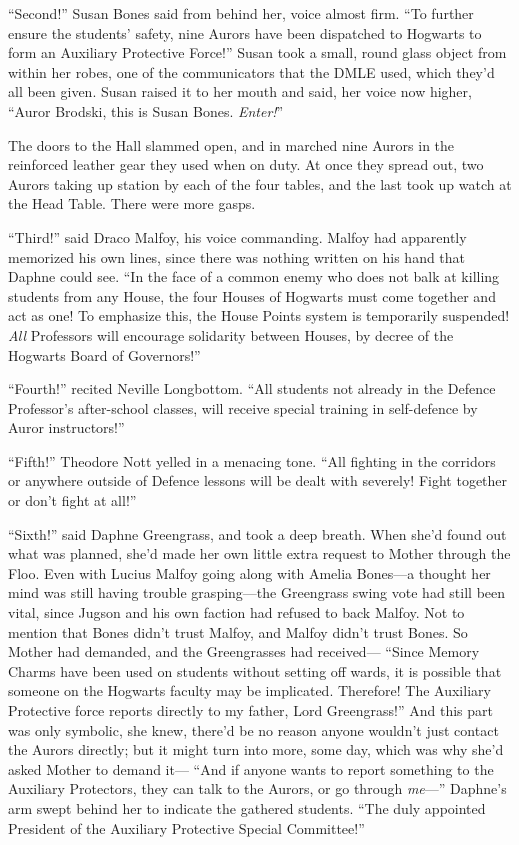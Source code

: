 “Second!” Susan Bones said from behind her, voice almost firm. “To further ensure the students’ safety, nine Aurors have been dispatched to Hogwarts to form an Auxiliary Protective Force!” Susan took a small, round glass object from within her robes, one of the communicators that the DMLE used, which they’d all been given. Susan raised it to her mouth and said, her voice now higher, “Auror Brodski, this is Susan Bones. \emph{Enter!}”

The doors to the Hall slammed open, and in marched nine Aurors in the reinforced leather gear they used when on duty. At once they spread out, two Aurors taking up station by each of the four tables, and the last took up watch at the Head Table. There were more gasps.

“Third!” said Draco Malfoy, his voice commanding. Malfoy had apparently memorized his own lines, since there was nothing written on his hand that Daphne could see. “In the face of a common enemy who does not balk at killing students from any House, the four Houses of Hogwarts must come together and act as one! To emphasize this, the House Points system is temporarily suspended! \emph{All} Professors will encourage solidarity between Houses, by decree of the Hogwarts Board of Governors!”

“Fourth!” recited Neville Longbottom. “All students not already in the Defence Professor’s after-school classes, will receive special training in self-defence by Auror instructors!”

“Fifth!” Theodore Nott yelled in a menacing tone. “All fighting in the corridors or anywhere outside of Defence lessons will be dealt with severely! Fight together or don’t fight at all!”

“Sixth!” said Daphne Greengrass, and took a deep breath. When she’d found out what was planned, she’d made her own little extra request to Mother through the Floo. Even with Lucius Malfoy going along with Amelia Bones—a thought her mind was still having trouble grasping—the Greengrass swing vote had still been vital, since Jugson and his own faction had refused to back Malfoy. Not to mention that Bones didn’t trust Malfoy, and Malfoy didn’t trust Bones. So Mother had demanded, and the Greengrasses had received— “Since Memory Charms have been used on students without setting off wards, it is possible that someone on the Hogwarts faculty may be implicated. Therefore! The Auxiliary Protective force reports directly to my father, Lord Greengrass!” And this part was only symbolic, she knew, there’d be no reason anyone wouldn’t just contact the Aurors directly; but it might turn into more, some day, which was why she’d asked Mother to demand it— “And if anyone wants to report something to the Auxiliary Protectors, they can talk to the Aurors, or go through \emph{me}—” Daphne’s arm swept behind her to indicate the gathered students. “The duly appointed President of the Auxiliary Protective Special Committee!”

